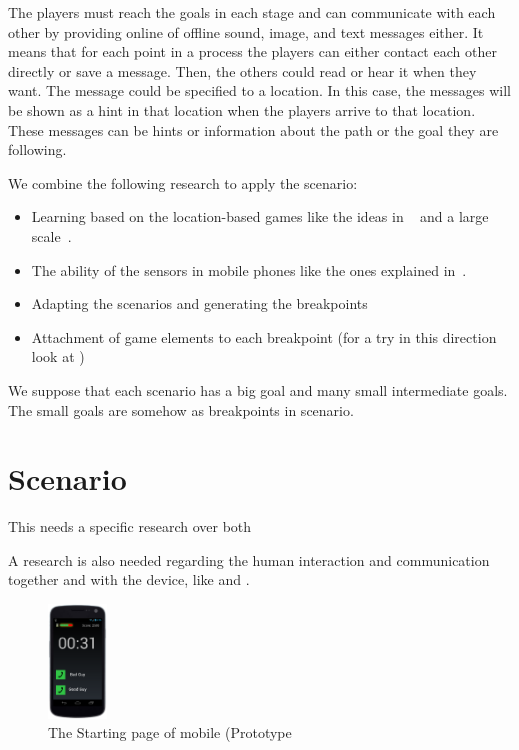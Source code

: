 \documentclass[conference]{IEEEtran}
\begin{document}
 The players must reach the goals in each stage and can communicate with each other by providing online of offline sound, image, and text messages either. It means that for each point in a process the players can either contact each other directly or save a message. Then, the others could read or hear it when they want. The message could be specified to a location. In this case, the messages will be shown as a hint in that location when the players arrive to that location. These messages can be hints or information about the path or the goal they are following.

We combine the following research to apply the scenario:
\begin{itemize}
\item Learning based on the location-based games like the ideas in ~\cite{rexplorer} and 
a large scale~\cite{scal-loc-g}.
\item The ability of the sensors in mobile phones like the ones explained in~\cite{sensors}.
\item Adapting the scenarios and generating the breakpoints
\item Attachment of game elements to each breakpoint (for a try in this direction 
look at \cite{totem})
\end{itemize}

We suppose that each scenario has a big goal and many small intermediate goals.
The small goals are somehow as breakpoints in scenario. 


\section{Scenario}
\cite{scenario}

This needs a specific research over both 

A research is also needed regarding the human interaction and communication
together and with the device, like \cite{behavior} and \cite{facial-vocal}.

\cite{scenario-adapt}
\cite{scenario-repurposing}


\cite{scenario-gen}
\cite{l-system}

\begin{figure}
 \centering
\includegraphics[width=0.14\textwidth]{kar}
\caption{The Starting page of mobile (Prototype}
\label{diagram}
\end{figure}




\end{document}
